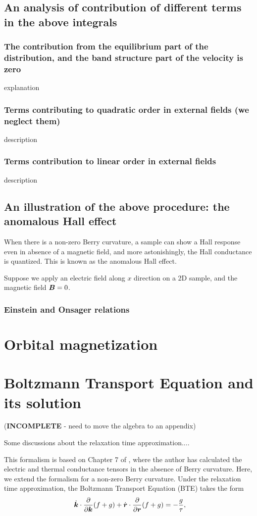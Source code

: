 \documentclass{report}
\renewcommand\vec[1]{\ensuremath\boldsymbol{#1}} %
\begin{document}
\section{An analysis of contribution of different terms in the above integrals}
\subsection{The contribution from the equilibrium part of the distribution, and the band structure part of the velocity is \textbf{zero}}
explanation
\subsection{Terms contributing to quadratic order  in external fields (we neglect them)}
description
\subsection{Terms contribution to linear order in external fields}
description
\section{An illustration of the above procedure: the anomalous Hall effect}
When there is a non-zero Berry curvature, a sample can show a Hall response even in absence of a magnetic field, and more astonishingly, the Hall conductance is quantized. This is known as the anomalous Hall effect.

Suppose we apply an electric field along $x$ direction on a 2D sample, and the magnetic field $\vec{B} = 0$.

\subsection{Einstein and Onsager relations}
\chapter{Orbital magnetization}
\chapter{Boltzmann Transport Equation and its solution}\label{sec:BTE-and-solution}
(\textbf{INCOMPLETE} - need to move the algebra to an appendix)

Some discussions about the relaxation time approximation....

This formalism is based on Chapter 7 of \cite{book:ZimanSolidState}, where the author has calculated the electric and thermal conductance tensors in the absence of Berry curvature. Here, we extend the formalism for a non-zero Berry curvature.
Under the relaxation time approximation, the Boltzmann Transport Equation (BTE) takes the form
\begin{equation}~\label{Eq:BTE}
\dot{\vec{k}}\cdot\frac{\partial}{\partial \vec{k}} (f + g) + \dot{\vec{r}}\cdot\frac{\partial}{\partial \vec{r}} (f + g) = -\frac{g}{\tau},
\end{equation}
\end{document}
